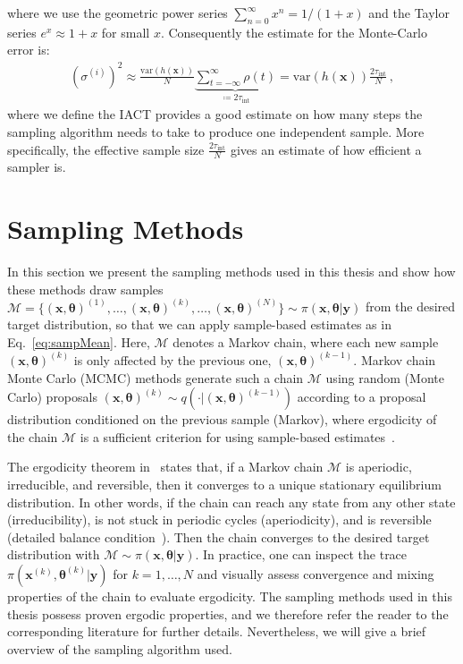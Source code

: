 where we use the geometric power series $\sum^{\infty}_{n=0} x^n= 1/ (1+x)$ and the Taylor series $ e^x \approx 1+x$ for small $x$.
Consequently the estimate for the Monte-Carlo error is:
\begin{align}
	(\sigma^{(i)})^2   \approx  \frac{\text{var}(h(\bm{x}) )}{N} \underbrace{\sum_{t = - \infty }^{\infty} \rho(t)}_{ \coloneqq 	2\tau_{\text{int}} } = \text{var}(h(\bm{x})) \frac{ 2 \tau_{\text{int}} }{N} \, , \label{eq:MCerr}
\end{align}
where we define the IACT provides a good estimate on how many steps the sampling algorithm needs to take to produce one independent sample.
More specifically, the effective sample size $\frac{ 2 \tau_{\text{int}} }{N}$ gives an estimate of how efficient a sampler is.



\section{Sampling Methods}
\label{sec:sampling}
In this section we present the sampling methods used in this thesis and show how these methods draw samples $ \mathcal{M} = \{ (\bm{x}, \bm{\theta} )^{(1)}, \dots, (\bm{x}, \bm{\theta} )^{(k)}, \dots, (\bm{x}, \bm{\theta})^{(N)} \} \sim \pi(\bm{x}, \bm{\theta} |  \bm{y})$ from the desired target distribution, so that we can apply sample-based estimates as in Eq.~\ref{eq:sampMean}.
Here, $\mathcal{M}$ denotes a Markov chain, where each new sample $(\bm{x}, \bm{\theta})^{(k)}$ is only affected by the previous one, $(\bm{x}, \bm{\theta})^{(k-1)}$.
Markov chain Monte Carlo (MCMC) methods generate such a chain $\mathcal{M}$ using random (Monte Carlo) proposals $(\bm{x}, \bm{\theta})^{(k)} \sim q( \cdot |  (\bm{x}, \bm{\theta})^{(k-1)})$ according to a proposal distribution conditioned on the previous sample (Markov), where ergodicity of the chain $\mathcal{M}$ is a sufficient criterion for using sample-based estimates~\cite{tan2016LecNot, roberts2004general}.

The ergodicity theorem in~\cite{tan2016LecNot} states that, if a Markov chain $\mathcal{M}$ is aperiodic, irreducible, and reversible, then it converges to a unique stationary equilibrium distribution.
In other words, if the chain can reach any state from any other state (irreducibility), is not stuck in periodic cycles (aperiodicity), and is reversible (detailed balance condition~\cite{tan2016LecNot}).
Then the chain converges to the desired target distribution  with $ \mathcal{M} \sim \pi(\bm{x}, \bm{\theta} |  \bm{y})$.
In practice, one can inspect the trace $\pi(\bm{x}^{(k)}, \bm{\theta}^{(k)} |  \bm{y})$ for $k = 1, \dots, N$ and visually assess convergence and mixing properties of the chain to evaluate ergodicity.
The sampling methods used in this thesis possess proven ergodic properties, and we therefore refer the reader to the corresponding literature for further details.
Nevertheless, we will give a brief overview of the sampling algorithm used.

